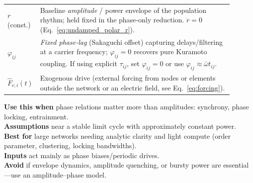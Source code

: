 \documentclass[12pt]{article}
\numberwithin{equation}{section}
\begin{document}
\begin{tcolorbox}
\begin{tabular}{@{}l p{0.9\linewidth}@{}}
\textbf{$r$}(const.) & Baseline \emph{amplitude} / power envelope of the population rhythm; held fixed in the phase‑only reduction. $\dot r=0$ (Eq.~\ref{eq:undamped_polar_r}).\\
\textbf{$\varphi_{ij}$} & \emph{Fixed phase‑lag} (Sakaguchi offset) capturing delays/filtering at a carrier frequency; $\varphi_{ij}=0$ recovers pure Kuramoto coupling. If using explicit $\tau_{ij}$, set $\varphi_{ij}{=}0$ or use $\varphi_{ij}\approx\bar\omega t_{ij}$.\\
\textbf{$\hat F_{e;i}(t)$}& Exogenous drive  (external forcing from nodes or elements outside the network or an electric field, see Eq.~\ref{eq:forcing}). 


\end{tabular}
\end{tcolorbox}

\begin{tcolorbox}[
  colback=gray!5,
  colframe=slate,
  colbacktitle=softblue!25,
  coltitle=softblue!60!black,
  fonttitle=\bfseries\small,
  title={\small When to Use It},
  boxrule=0.4pt,
  enhanced, sharp corners,
  left=4pt,right=4pt,top=3pt,bottom=3pt,
  boxsep=2pt,
  before skip=6pt, after skip=6pt
]
\scriptsize
\textbf{Use this when} phase relations matter more than amplitudes: synchrony, phase locking, entrainment.\\
\textbf{Assumptions} near a stable limit cycle with approximately constant power.\\
\textbf{Best for} large networks needing analytic clarity and light compute (order parameter, clustering, locking bandwidths).\\
\textbf{Inputs} act mainly as phase biases/periodic drives.\\
\textbf{Avoid} if envelope dynamics, amplitude quenching, or bursty power are essential—use an amplitude–phase model.
\end{tcolorbox}
\end{document}
